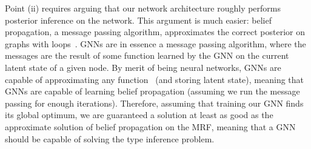 Point (ii) requires arguing that our network architecture roughly performs posterior inference on the network.
This argument is much easier: belief propagation, a message passing algorithm, approximates the correct posterior on graphs with loops~\cite{weiss2000correctness}.
GNNs are in essence a message passing algorithm, where the messages are the result of some function learned by the GNN on the current latent state of a given node.
By merit of being neural networks, GNNs are capable of approximating any function~\cite{hornik1989multilayer} (and storing latent state), meaning that GNNs are capable of learning belief propagation (assuming we run the message passing for enough iterations).
Therefore, assuming that training our GNN finds its global optimum, we are guaranteed a solution at least as good as the approximate solution of belief propagation on the MRF, meaning that a GNN should be capable of solving the type inference problem.

